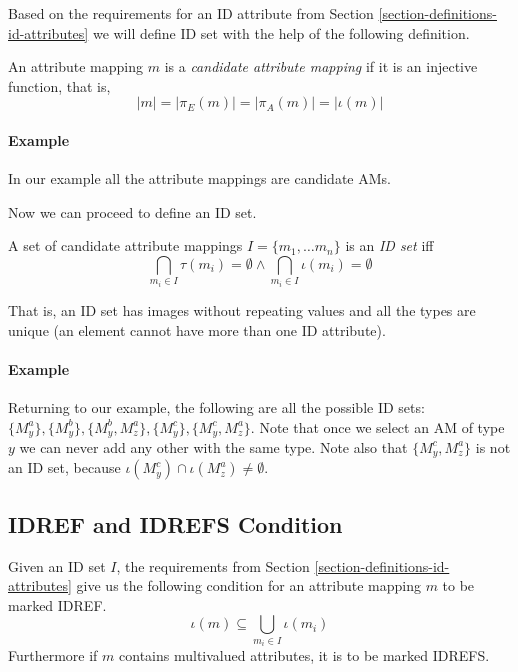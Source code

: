 Based on the requirements for an ID attribute from Section \ref{section-definitions-id-attributes} we will define ID set with the help of the following definition.

\begin{define}
An attribute mapping $m$ is a \textit{candidate attribute mapping} if it is an injective function, that is,
\[|m| = |\pi_E(m)| = |\pi_A(m)| = |\iota(m)|\]
\end{define}

\paragraph{Example}
In our example all the attribute mappings are candidate AMs.

Now we can proceed to define an ID set.

\begin{define}[ID set]
A set of candidate attribute mappings $I = \{m_1, \ldots m_n\}$ is an \textit{ID set} iff
\[\bigcap_{m_i \in I} \tau(m_i) = \emptyset \wedge \bigcap_{m_i \in I} \iota(m_i) = \emptyset\]
\end{define}

That is, an ID set has images without repeating values and all the types are unique (an element cannot have more than one ID attribute).

\paragraph{Example}
Returning to our example, the following are all the possible ID sets: $\{ M_{y}^{a} \}, \{ M_{y}^{b} \}, \{ M_{y}^{b}, M_{z}^{a} \}, \{ M_{y}^{c} \}, \{ M_{y}^{c}, M_{z}^{a} \}$. Note that once we select an AM of type $y$ we can never add any other with the same type. Note also that $\{ M_{y}^{c}, M_{z}^{a} \}$ is not an ID set, because $\iota(M_{y}^{c}) \cap \iota(M_{z}^{a}) \neq \emptyset$.

\subsection{IDREF and IDREFS Condition}

Given an ID set $I$, the requirements from Section \ref{section-definitions-id-attributes} give us the following condition for an attribute mapping $m$ to be marked IDREF.
\[\iota(m) \subseteq \bigcup_{m_i \in I} \iota(m_i)\]
Furthermore if $m$ contains multivalued attributes, it is to be marked IDREFS.

